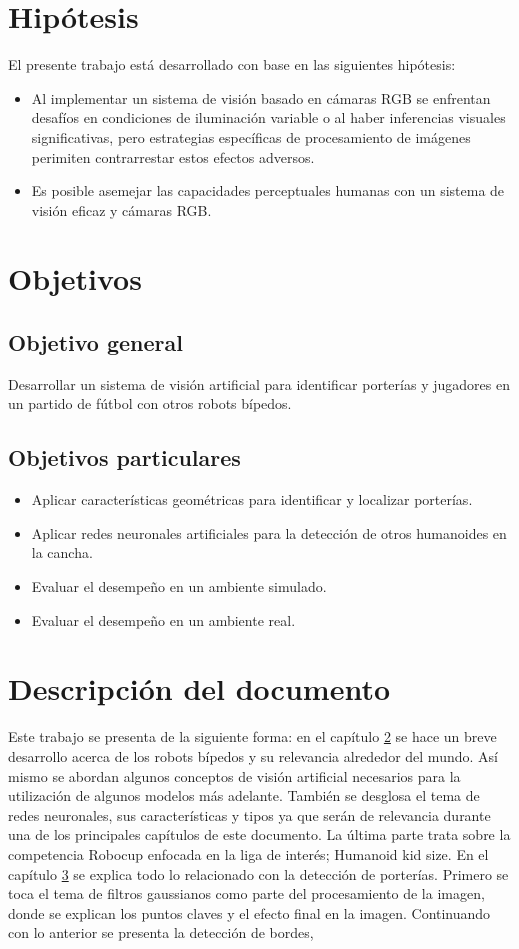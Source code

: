 \section{Hipótesis}
El presente trabajo está desarrollado con base en las siguientes hipótesis:
\begin{itemize}
	\item Al implementar un sistema de visión basado en cámaras RGB se enfrentan desafíos en condiciones de iluminación variable o al haber inferencias visuales significativas, pero estrategias específicas de procesamiento de imágenes perimiten contrarrestar estos efectos adversos.
	\item Es posible asemejar las capacidades perceptuales humanas con un sistema de visión eficaz y cámaras RGB.
\end{itemize}

\section{Objetivos}


\subsection*{Objetivo general}
Desarrollar un sistema de visión artificial para identificar porterías y jugadores en un partido de fútbol con otros robots bípedos.
\subsection*{Objetivos particulares}
\begin{itemize}
    \item Aplicar características geométricas para identificar y localizar porterías.
    \item Aplicar redes neuronales artificiales para la detección de otros humanoides en la cancha.
    \item Evaluar el desempeño en un ambiente simulado.
    \item Evaluar el desempeño en un ambiente real.
\end{itemize}
\section{Descripción del documento}
Este trabajo se presenta de la siguiente forma: en el capítulo \hyperref[sec:marcoteorico]{2} se hace un breve desarrollo acerca de los robots bípedos y su relevancia alrededor del mundo. Así mismo se abordan algunos conceptos de visión artificial necesarios para la utilización de algunos modelos más adelante. También se desglosa el tema de redes neuronales, sus características y tipos ya que serán de relevancia durante una de los principales capítulos de este documento. La última parte trata sobre la competencia Robocup enfocada en la liga de interés; Humanoid kid size. En el capítulo \hyperref[sec:porteria]{3} se explica todo lo relacionado con la detección de porterías. Primero se toca el tema de filtros gaussianos como parte del procesamiento de la imagen, donde se explican los puntos claves y el efecto final en la imagen. Continuando con lo anterior se presenta la detección de bordes,   
